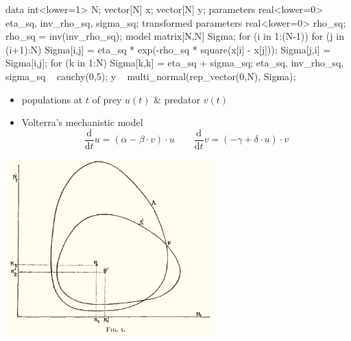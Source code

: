 \documentclass[10pt]{report}
\begin{document}
%
\vspace*{-5pt}
\begin{stancode}
data {
  int<lower=1> N;  vector[N] x; vector[N] y;
} parameters {
  real<lower=0> eta_sq, inv_rho_sq, sigma_sq;
} transformed parameters {
  real<lower=0> rho_sq; rho_sq = inv(inv_rho_sq);
} model {
  matrix[N,N] Sigma;
  for (i in 1:(N-1)) {
    for (j in (i+1):N) {
      Sigma[i,j] = eta_sq * exp(-rho_sq * square(x[i] - x[j]));
      Sigma[j,i] = Sigma[i,j];
  }}
  for (k in 1:N) Sigma[k,k] = eta_sq + sigma_sq;
  eta_sq, inv_rho_sq, sigma_sq ~ cauchy(0,5);
  y ~ multi_normal(rep_vector(0,N), Sigma);
}
\end{stancode}


\begin{itemize}
\item populations at $t$ of prey $u(t)$ \& predator $v(t)$
\item Volterra's mechanistic model
$$
\frac{\textrm{d}}{\textrm{d}t}u = (\alpha - \beta \cdot v) \cdot u
\qquad
\frac{\textrm{d}}{\textrm{d}t}v = (-\gamma + \delta \cdot u) \cdot v
$$
\vspace*{-12pt}
\end{itemize}


\begin{center}
\includegraphics[width=0.6\textwidth]{img/volterra-solutions.jpg}
\end{center}
\end{document}
